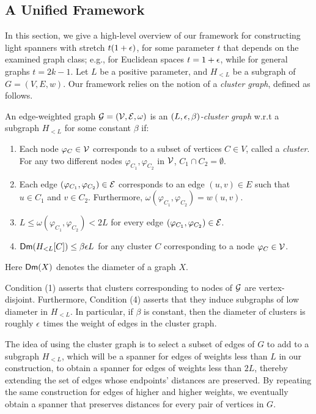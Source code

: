 


\subsection{A Unified Framework}\label{subsec:unified-framework-intro}


In this section, we give a high-level overview of our framework for constructing light spanners with stretch $t(1+\epsilon)$, for some parameter $t$ that depends on the examined graph class; e.g., for Euclidean spaces $t  = 1+\epsilon$, while for general graphs $t = 2k-1$.  Let $L$ be a positive parameter, and $H_{< L}$ be a subgraph of  $G = (V,E,w)$. Our framework relies on the notion of a {\em cluster graph}, defined as follows.


\begin{definition}\label{def:ClusterGraph-Param} An edge-weighted graph $\mathcal{G}= (\mathcal{V},\mathcal{E},\omega)$ is an \emph{$(L,\epsilon,\beta)$-cluster graph} w.r.t a subgraph $H_{< L}$ for some constant $\beta$ if:
	\begin{enumerate}
		\item Each node $\varphi_C \in \mathcal{V}$ corresponds to a subset of vertices $C \in V$, called a \emph{cluster}. For any two different nodes $\varphi_{C_1}, \varphi_{C_2}$ in $\mathcal{V}$, $C_1\cap C_2 = \emptyset$.
		\item Each edge $(\varphi_{C_1},\varphi_{C_2})\in \mathcal{E}$ corresponds to an edge $(u,v)\in E$ such that $u \in C_1$ and $v\in C_2$. Furthermore, $\omega(\varphi_{C_1},\varphi_{C_2}) = w(u,v)$.
		\item $L \leq \omega(\varphi_{C_1},\varphi_{C_2}) < 2L$ for every edge $(\varphi_{C_1},\varphi_{C_2})\in \mathcal{E}$.
		\item $\mathsf{Dm}(H_{< L}[C]) \leq \beta \epsilon L$ for any cluster $C$ corresponding to a node $\varphi_C \in \mathcal{V}$.  
	\end{enumerate} 
	Here $\mathsf{Dm}(X)$ denotes the diameter of a graph $X$. 
\end{definition} 
Condition (1) asserts that clusters corresponding to nodes of $\mathcal{G}$ are vertex-disjoint. Furthermore, Condition (4) asserts that they induce subgraphs of low diameter in $H_{< L}$. In particular, if $\beta$ is constant, then the diameter of clusters is roughly $\epsilon$ times the weight of edges in the cluster graph.  

The idea of using the cluster graph is to select a subset of edges of $G$ to add to a subgraph $H_{< L}$, which will be a spanner for edges of weights less than $L$ in our construction, to obtain a spanner for edges of weights less than $2L$, thereby extending the set of edges whose endpoints' distances are preserved. By repeating the same construction for edges of higher and higher weights, we eventually obtain a spanner that preserves distances for every pair of vertices in $G$.


